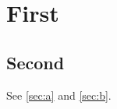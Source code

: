 \documentclass{article}
\begin{document}
\section{First}\label{sec:a}
\subsection{Second}\label{sec:b}
See \autoref{sec:a} and \autoref*{sec:b}.
\end{document}
